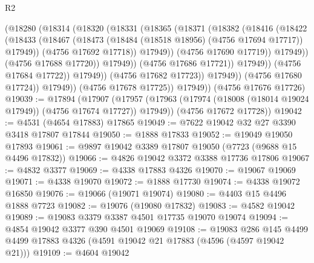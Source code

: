 \begin{lexlean}{R2}
\begin{coremodule}
                                (@18280
                                  (@18314
                                    (@18320
                                      (@18331
                                        (@18365
                                          (@18371
                                            (@18382
                                              (@18416
                                                (@18422
                                                  (@18433
                                                    (@18467
                                                      (@18473
                                                        (@18484
                                                          (@18518 @18956)
                                                          (@4756 @17694 @17717))
                                                        @17949))
                                                    (@4756 @17692 @17718))
                                                  @17949))
                                              (@4756 @17690 @17719))
                                            @17949))
                                        (@4756 @17688 @17720))
                                      @17949))
                                  (@4756 @17686 @17721))
                                @17949))
                            (@4756 @17684 @17722))
                          @17949))
                      (@4756 @17682 @17723))
                    @17949))
                (@4756 @17680 @17724))
              @17949))
          (@4756 @17678 @17725))
        @17949))
    (@4756 @17676 @17726)
@19039 := @17894
    (@17907
      (@17957 (@17963 (@17974 (@18008 (@18014 @19024 @17949)) (@4756 @17674 @17727)) @17949))
      (@4756 @17672 @17728))
@19042 := @4531 (@4654 @17883) @17865
@19049 := @7622 @19042 @32 @27 @3390 @3418 @17807 @17844
@19050 := @1888 @17833
@19052 := @19049 @19050 @17893
@19061 := @9897 @19042 @3389 @17807 @19050 (@7723 (@9688 @15 @4496 @17832))
@19066 := @4826 @19042 @3372 @3388 @17736 @17806
@19067 := @4832 @3377
@19069 := @4338 @17883 @4326
@19070 := @19067 @19069
@19071 := @4338 @19070
@19072 := @1888 @17730
@19074 := @4338 @19072 @16850
@19076 := @19066 (@19071 @19074)
@19080 := @4403 @15 @4496 @1888 @7723
@19082 := @19076 (@19080 @17832)
@19083 := @4582 @19042
@19089 := @19083 @3379 @3387 @4501 @17735 @19070 @19074
@19094 := @4854 @19042 @3377 @390 @4501 @19069
@19108 := @19083
    @286
    @145
    @4499
    @4499
    @17883
    @4326
    (@4591 @19042 @21 @17883 (@4596 (@4597 @19042 @21)))
@19109 := @4604 @19042

\end{coremodule}
\end{lexlean}
